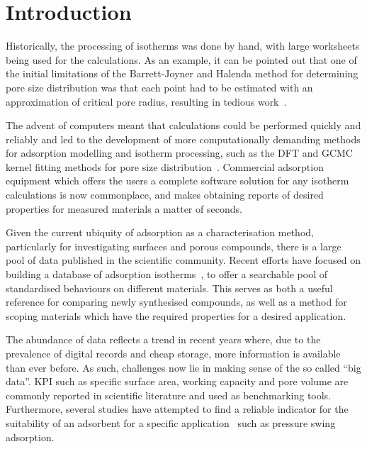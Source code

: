 
\section{Introduction}

Historically, the processing of isotherms was done by hand, with large
worksheets being used for the calculations. As an example,
it can be pointed out that one of the initial limitations of the
Barrett-Joyner and Halenda method for determining pore size distribution
was that each point had to be estimated with an approximation of critical
pore radius, resulting in tedious 
work~\cite{barrettDeterminationPoreVolume1951}.

The advent of computers meant that calculations could be performed
quickly and reliably and led to the development of more computationally
demanding methods for adsorption modelling and isotherm processing, such 
as the \gls{DFT} and \gls{GCMC} kernel fitting methods for pore size 
distribution~\cite{seatonNewAnalysisMethod1989,%
	tarazonaPhaseEquilibriaFluid1987}.
Commercial adsorption equipment which offers the users
a complete software solution for any isotherm calculations is now
commonplace, and makes obtaining reports of desired properties
for measured materials a matter of seconds.

Given the current ubiquity of adsorption as a characterisation method,
particularly for investigating surfaces and porous compounds,
there is a large pool of data published in the scientific community.
Recent efforts have focused on building a database of adsorption
isotherms~\cite{sideriusNISTARPAEDatabase2015}, to offer a searchable
pool of standardised behaviours on different materials. This serves as
both a useful reference for comparing newly synthesised compounds, 
as well as a method for scoping materials which have the
required properties for a desired application.

The abundance of data reflects a trend in recent years where, due
to the prevalence of digital records and cheap storage, more
information is available than ever before. As such, challenges
now lie in making sense of the so called ``big data''.
\gls{KPI} such as specific surface area, working
capacity and pore volume are commonly reported in scientific literature
and used as benchmarking tools. Furthermore,
several studies have attempted to find a reliable indicator for
the suitability of an adsorbent for a specific
application~\cite{regeSimpleParameterSelecting2001, %
	ackley2000psa,%
	wiersumAdsorbentPerformanceIndicator2013} such as pressure swing
adsorption.

